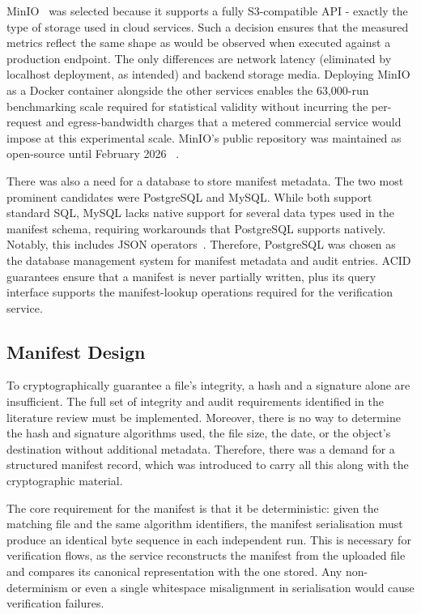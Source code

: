\documentclass[12pt,a4paper]{article}
\begin{document}
MinIO~\cite{minio-docs} was selected because it supports a fully S3-compatible API - exactly the type of storage used in cloud services. Such a decision ensures that the measured metrics reflect the same shape as would be observed when executed against a production endpoint. The only differences are network latency (eliminated by localhost deployment, as intended) and backend storage media. Deploying MinIO as a Docker container alongside the other services enables the 63,000-run benchmarking scale required for statistical validity without incurring the per-request and egress-bandwidth charges that a metered commercial service would impose at this experimental scale. MinIO's public repository was maintained as open-source until February 2026 ~\cite{minio-2025}.

There was also a need for a database to store manifest metadata. The two most prominent candidates were PostgreSQL and MySQL. While both support standard SQL, MySQL lacks native support for several data types used in the manifest schema, requiring workarounds that PostgreSQL supports natively. Notably, this includes JSON operators~\cite{postgresql-json-docs}. Therefore, PostgreSQL was chosen as the database management system for manifest metadata and audit entries. ACID guarantees ensure that a manifest is never partially written, plus its query interface supports the manifest-lookup operations required for the verification service.

\subsection{Manifest Design}

To cryptographically guarantee a file's integrity, a hash and a signature alone are insufficient. The full set of integrity and audit requirements identified in the literature review must be implemented. Moreover, there is no way to determine the hash and signature algorithms used, the file size, the date, or the object's destination without additional metadata. Therefore, there was a demand for a structured manifest record, which was introduced to carry all this along with the cryptographic material.

The core requirement for the manifest is that it be deterministic: given the matching file and the same algorithm identifiers, the manifest serialisation must produce an identical byte sequence in each independent run. This is necessary for verification flows, as the service reconstructs the manifest from the uploaded file and compares its canonical representation with the one stored. Any non-determinism or even a single whitespace misalignment in serialisation would cause verification failures.
\end{document}
